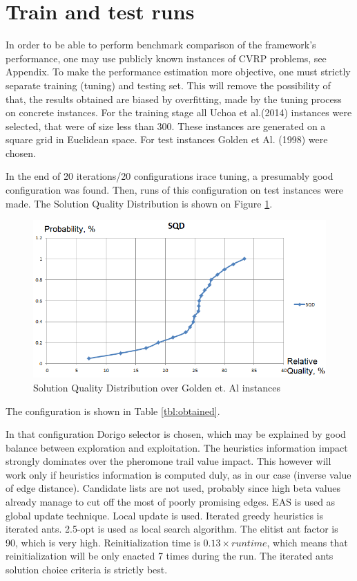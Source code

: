 \documentclass[11pt,a4paper,oneside]{book}
\begin{document}
\section{Train and test runs}

In order to be able to perform benchmark comparison of the framework's performance, one may use publicly known instances of CVRP problems, see Appendix. To make the performance estimation more objective, one must strictly separate training (tuning) and testing set. This will remove the possibility of that, the results obtained are biased by overfitting, made by the tuning process on concrete instances. For the training stage all Uchoa et al.(2014) instances were selected, that were of size less than 300. These instances are generated on a square grid in Euclidean space. For test instances Golden et Al. (1998) were chosen.

In the end of 20 iterations/20 configurations irace tuning, a presumably good configuration was found. Then, runs of this configuration on test instances were made. The Solution Quality Distribution is shown on Figure \ref{fig:sqd-golden}.

\begin{figure}[h]
  \centering
    \includegraphics[scale=0.8]{sqd-golden.png}
  \caption{Solution Quality Distribution over Golden et. Al instances}
  \label{fig:sqd-golden}
\end{figure}

The configuration is shown in Table \ref{tbl:obtained}.

In that configuration Dorigo selector is chosen, which may be explained by good balance between exploration and exploitation. The heuristics information impact strongly dominates over the pheromone trail value impact. This however will work only if heuristics information is computed duly, as in our case (inverse value of edge distance). Candidate lists are not used, probably since high beta values already manage to cut off the most of poorly promising edges. EAS is used as global update technique. Local update is used. Iterated greedy heuristics is iterated ants. 2.5-opt is used as local search algorithm. The elitist ant factor is 90, which is very high. Reinitialization time is $0.13 \times runtime$, which means that reinitialization will be only enacted 7 times during the run. The iterated ants solution choice criteria is strictly best.
\end{document}

